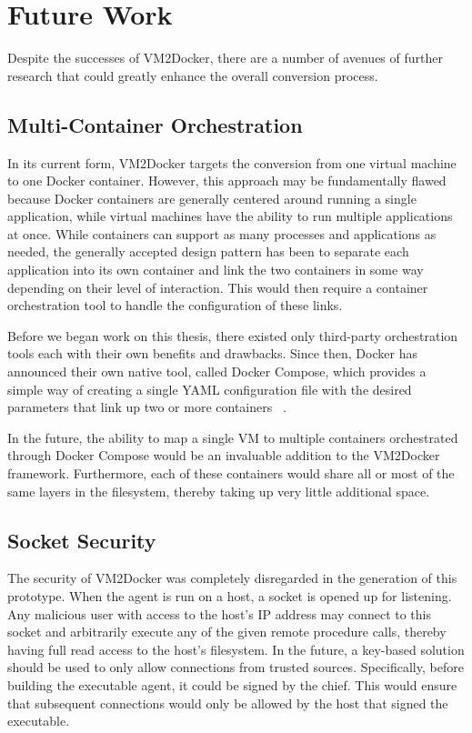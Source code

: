 \section{Future Work}
\label{sec:future}
Despite the successes of VM2Docker, there are a number of avenues of further research that could greatly enhance the overall conversion process.

\subsection{Multi-Container Orchestration}
In its current form, VM2Docker targets the conversion from one virtual machine to one Docker container. However, this approach may be fundamentally flawed because Docker containers are generally centered around running a single application, while virtual machines have the ability to run multiple applications at once. While containers can support as many processes and applications as needed, the generally accepted design pattern has been to separate each application into its own container and link the two containers in some way depending on their level of interaction. This would then require a container orchestration tool to handle the configuration of these links. 

Before we began work on this thesis, there existed only third-party orchestration tools each with their own benefits and drawbacks. Since then, Docker has announced their own native tool, called Docker Compose, which provides a simple way of creating a single YAML configuration file with the desired parameters that link up two or more containers ~\cite{dockercompose}.

In the future, the ability to map a single VM to multiple containers orchestrated through Docker Compose would be an invaluable addition to the VM2Docker framework. Furthermore, each of these containers would share all or most of the same layers in the filesystem, thereby taking up very little additional space.

\subsection{Socket Security}
The security of VM2Docker was completely disregarded in the generation of this prototype. When the agent is run on a host, a socket is opened up for listening. Any malicious user with access to the host's IP address may connect to this socket and arbitrarily execute any of the given remote procedure calls, thereby having full read access to the host's filesystem. In the future, a key-based solution should be used to only allow connections from trusted sources. Specifically, before building the executable agent, it could be signed by the chief. This would ensure that subsequent connections would only be allowed by the host that signed the executable.

